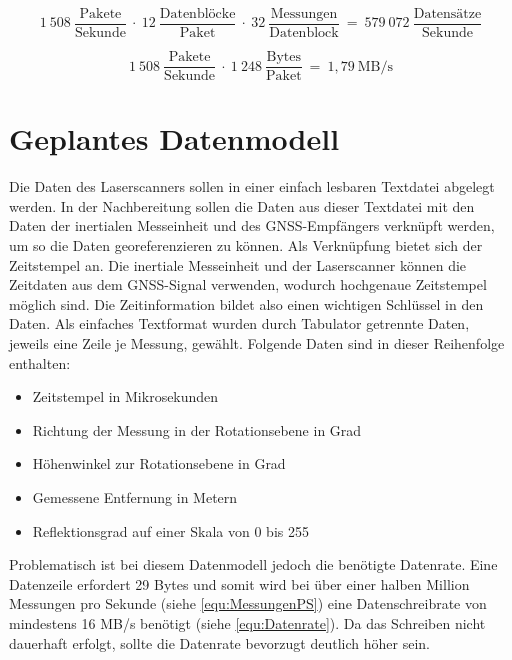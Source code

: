 \documentclass[a4paper,12pt,bibliography=totoc, listof=totoc,titlepage,pointlessnumbers]{scrreprt}
\begin{document}
\begin{equation}
1~508~\frac{\text{Pakete}}{\text{Sekunde}}~\cdot~12~\frac{\text{Datenbl\"{o}cke}}{\text{Paket}}~\cdot~
32~\frac{\text{Messungen}}{\text{Datenblock}}~=~579~072~\frac{\text{Datens\"{a}tze}}{\text{Sekunde}}
 \label{equ:MessungenPS}
\end{equation}

\begin{equation}
1~508~\frac{\text{Pakete}}{\text{Sekunde}}~\cdot~1~248~\frac{\text{Bytes}}{\text{Paket}}~=~1,79~\text{MB/s}
 \label{equ:Ausgangsrate}
\end{equation}

\section{Geplantes Datenmodell}
\label{s:datenmodell}
Die Daten des Laser\-scan\-ners sollen in einer einfach lesbaren Textdatei abgelegt werden. In der Nachbereitung sollen die Daten aus dieser Textdatei mit den Daten der inertialen Messeinheit und des GNSS-Empfängers verknüpft werden, um so die Daten georeferenzieren zu können. Als Verknüpfung bietet sich der Zeitstempel an. Die inertiale Messeinheit und der Laser\-scan\-ner können die Zeitdaten aus dem GNSS-Signal verwenden, wodurch hochgenaue Zeitstempel möglich sind. Die Zeitinformation bildet also einen wichtigen Schlüssel in den Daten. Als einfaches Textformat wurden durch Tabulator getrennte Daten, jeweils eine Zeile je Messung, gewählt. Folgende Daten sind in dieser Reihenfolge enthalten:

\begin{itemize}
 \item Zeitstempel in Mikrosekunden
 \item Richtung der Messung in der Rotationsebene in Grad
 \item Höhenwinkel zur Rotationsebene in Grad
 \item Gemessene Entfernung in Metern
 \item Reflektionsgrad auf einer Skala von 0 bis 255
\end{itemize}

Problematisch ist bei diesem Datenmodell jedoch die benötigte Datenrate. Eine Datenzeile erfordert 29 Bytes und somit wird bei über einer halben Million Messungen pro Sekunde (siehe \autoref{equ:MessungenPS}) eine Datenschreibrate von mindestens 16 MB/s benötigt (siehe \autoref{equ:Datenrate}). Da das Schreiben nicht dauerhaft erfolgt, sollte die Datenrate bevorzugt deutlich höher sein.
\end{document}
